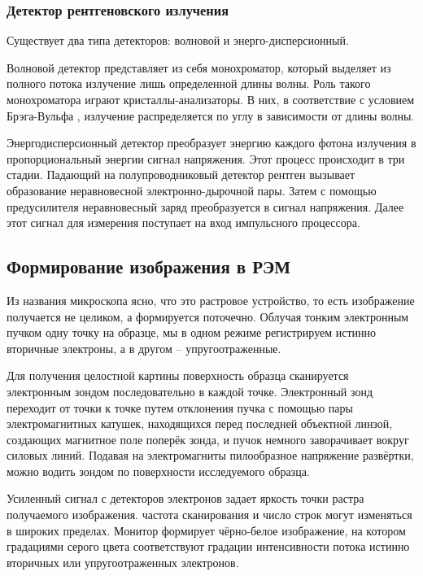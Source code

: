 \documentclass[a4paper,12pt]{article}	%
\begin{document}
        \subsubsection{Детектор рентгеновского излучения}
        
\noindent Существует два типа детекторов: волновой и энерго-дисперсионный.

\medskip
            
\noindent Волновой детектор представляет из себя монохроматор, который выделяет из полного потока излучение лишь определенной длины волны. Роль такого монохроматора играют кристаллы-анализаторы. В них, в соответствие с условием Брэга-Вульфа , излучение распределяется по углу в зависимости от длины волны.

\medskip
            
\noindent Энергодисперсионный детектор преобразует энергию каждого фотона излучения в пропорциональный энергии сигнал напряжения. Этот процесс происходит в три стадии. Падающий на полупроводниковый детектор рентген вызывает образование неравновесной электронно-дырочной пары. Затем с помощью предусилителя неравновесный заряд преобразуется в сигнал напряжения. Далее этот сигнал для измерения поступает на вход импульсного процессора.        

    \subsection{Формирование изображения в РЭМ}
	
\noindent Из названия микроскопа ясно, что это растровое устройство, то есть изображение получается не целиком, а формируется поточечно. Облучая тонким электронным пучком одну точку на образце, мы в одном режиме регистрируем истинно вторичные электроны, а в другом – упругоотраженные.

\medskip
        
\noindent Для получения целостной картины поверхность образца сканируется электронным зондом последовательно в каждой точке. Электронный зонд переходит от точки к точке путем отклонения пучка с помощью пары электромагнитных катушек, находящихся перед последней объектной линзой, создающих магнитное поле поперёк зонда, и пучок немного заворачивает вокруг силовых линий. Подавая на электромагниты пилообразное напряжение развёртки, можно водить зондом по поверхности исследуемого образца.

\medskip

\noindent Усиленный сигнал с детекторов электронов задает яркость точки растра получаемого изображения. частота сканирования и число строк могут изменяться в широких пределах. Монитор формирует чёрно-белое изображение, на котором градациями серого цвета соответствуют градации интенсивности потока истинно вторичных или упругоотраженных электронов.
\end{document}
